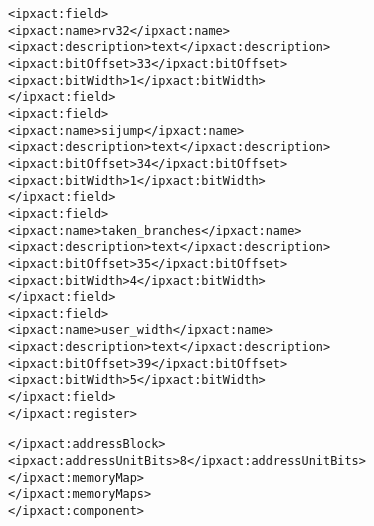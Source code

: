 \begin{alltt}
               <ipxact:field>
                  <ipxact:name>rv32</ipxact:name>
                  <ipxact:description>text</ipxact:description>
                  <ipxact:bitOffset>33</ipxact:bitOffset>
                  <ipxact:bitWidth>1</ipxact:bitWidth>
               </ipxact:field>
               <ipxact:field>
                  <ipxact:name>sijump</ipxact:name>
                  <ipxact:description>text</ipxact:description>
                  <ipxact:bitOffset>34</ipxact:bitOffset>
                  <ipxact:bitWidth>1</ipxact:bitWidth>
               </ipxact:field>
               <ipxact:field>
                  <ipxact:name>taken_branches</ipxact:name>
                  <ipxact:description>text</ipxact:description>
                  <ipxact:bitOffset>35</ipxact:bitOffset>
                  <ipxact:bitWidth>4</ipxact:bitWidth>
               </ipxact:field>
               <ipxact:field>
                  <ipxact:name>user_width</ipxact:name>
                  <ipxact:description>text</ipxact:description>
                  <ipxact:bitOffset>39</ipxact:bitOffset>
                  <ipxact:bitWidth>5</ipxact:bitWidth>
               </ipxact:field>
            </ipxact:register>

         </ipxact:addressBlock>
         <ipxact:addressUnitBits>8</ipxact:addressUnitBits>
      </ipxact:memoryMap>
   </ipxact:memoryMaps>
</ipxact:component>

\end{alltt}

